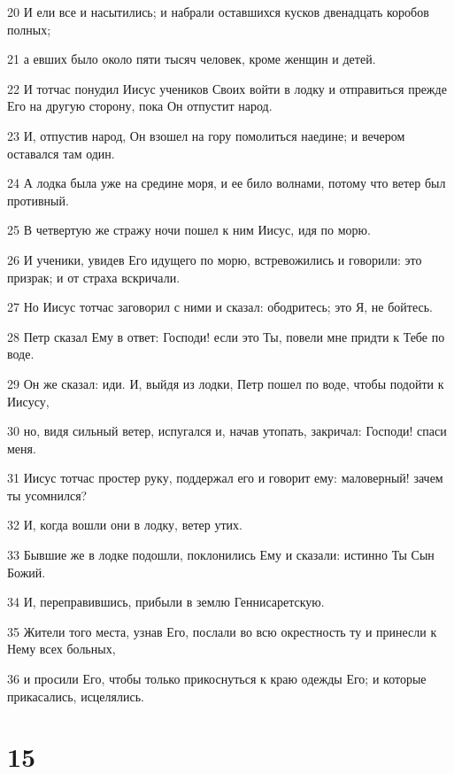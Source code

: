 \par 20 И ели все и насытились; и набрали оставшихся кусков двенадцать коробов полных;
\par 21 а евших было около пяти тысяч человек, кроме женщин и детей.
\par 22 И тотчас понудил Иисус учеников Своих войти в лодку и отправиться прежде Его на другую сторону, пока Он отпустит народ.
\par 23 И, отпустив народ, Он взошел на гору помолиться наедине; и вечером оставался там один.
\par 24 А лодка была уже на средине моря, и ее било волнами, потому что ветер был противный.
\par 25 В четвертую же стражу ночи пошел к ним Иисус, идя по морю.
\par 26 И ученики, увидев Его идущего по морю, встревожились и говорили: это призрак; и от страха вскричали.
\par 27 Но Иисус тотчас заговорил с ними и сказал: ободритесь; это Я, не бойтесь.
\par 28 Петр сказал Ему в ответ: Господи! если это Ты, повели мне придти к Тебе по воде.
\par 29 Он же сказал: иди. И, выйдя из лодки, Петр пошел по воде, чтобы подойти к Иисусу,
\par 30 но, видя сильный ветер, испугался и, начав утопать, закричал: Господи! спаси меня.
\par 31 Иисус тотчас простер руку, поддержал его и говорит ему: маловерный! зачем ты усомнился?
\par 32 И, когда вошли они в лодку, ветер утих.
\par 33 Бывшие же в лодке подошли, поклонились Ему и сказали: истинно Ты Сын Божий.
\par 34 И, переправившись, прибыли в землю Геннисаретскую.
\par 35 Жители того места, узнав Его, послали во всю окрестность ту и принесли к Нему всех больных,
\par 36 и просили Его, чтобы только прикоснуться к краю одежды Его; и которые прикасались, исцелялись.

\chapter{15}


